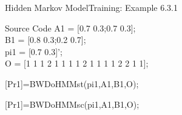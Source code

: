 \documentclass[10pt]{beamer}
\begin{document}
\begin{frame}{Hidden Markov Model}{Training: Example 6.3.1}
    \begin{block}{Source Code}
        A1 = [0.7 0.3;0.7 0.3];\\
        B1 = [0.8 0.3;0.2 0.7];\\
        pi1 = [0.7 0.3]';\\
         
        O = [1 1 1 2 1 1 1 1 2 1 1 1 1 2 2 1 1];
        
        [Pr1]=BWDoHMMst(pi1,A1,B1,O);
        
        [Pr1]=BWDoHMMsc(pi1,A1,B1,O);

    \end{block}
\end{frame}
\end{document}

